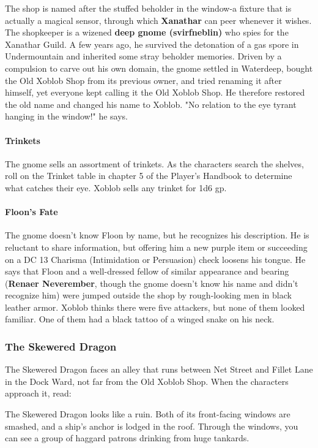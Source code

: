 \documentclass[10pt,a4paper,twoside,twocolumn,openany,nodeprecatedcode]{dndbook}
\begin{document}
The shop is named after the stuffed beholder in the window-a fixture that is actually a magical sensor, through which \textbf{Xanathar} can peer whenever it wishes.
The shopkeeper is a wizened \textbf{deep gnome (svirfneblin)} who spies for the Xanathar Guild. A few years ago, he survived the detonation of a gas spore in Undermountain and inherited some stray beholder memories. Driven by a compulsion to carve out his own domain, the gnome settled in Waterdeep, bought the Old Xoblob Shop from its previous owner, and tried renaming it after himself, yet everyone kept calling it the Old Xoblob Shop. He therefore restored the old name and changed his name to Xoblob. "No relation to the eye tyrant hanging in the window!" he says.
\paragraph{Trinkets}
The gnome sells an assortment of trinkets. As the characters search the shelves, roll on the Trinket table in chapter 5 of the Player's Handbook to determine what catches their eye. Xoblob sells any trinket for 1d6 gp.
\paragraph{Floon's Fate}
The gnome doesn't know Floon by name, but he recognizes his description. He is reluctant to share information, but offering him a new purple item or succeeding on a DC 13 Charisma (Intimidation or Persuasion) check loosens his tongue. He says that Floon and a well-dressed fellow of similar appearance and bearing (\textbf{Renaer Neverember}, though the gnome doesn't know his name and didn't recognize him) were jumped outside the shop by rough-looking men in black leather armor. Xoblob thinks there were five attackers, but none of them looked familiar. One of them had a black tattoo of a winged snake on his neck.
\subsubsection{The Skewered Dragon}
The Skewered Dragon faces an alley that runs between Net Street and Fillet Lane in the Dock Ward, not far from the Old Xoblob Shop. When the characters approach it, read:
\begin{DndReadAloud}{}
The Skewered Dragon looks like a ruin. Both of its front-facing windows are smashed, and a ship's anchor is lodged in the roof. Through the windows, you can see a group of haggard patrons drinking from huge tankards.
\end{DndReadAloud}
\end{document}
